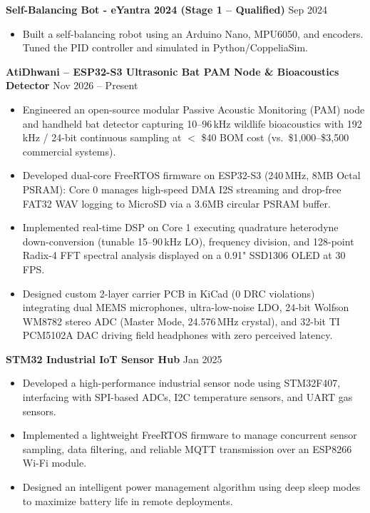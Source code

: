 \documentclass[10pt,a4paper]{article}%
\begin{document}
\noindent \textbf{Self-Balancing Bot - eYantra 2024 (Stage 1 – Qualified)} \hfill Sep 2024%
\begin{itemize}[leftmargin=15pt, nosep, topsep=0pt]%
\item Built a self-balancing robot using an Arduino Nano, MPU6050, and encoders. Tuned the PID controller and simulated in Python/CoppeliaSim.%
\end{itemize} \vspace{8pt}

\noindent \textbf{AtiDhwani -- ESP32-S3 Ultrasonic Bat PAM Node \& Bioacoustics Detector} \hfill Nov 2026 -- Present%
\begin{itemize}[leftmargin=15pt, nosep, topsep=0pt]%
\item Engineered an open-source modular Passive Acoustic Monitoring (PAM) node and handheld bat detector capturing 10--96\,kHz wildlife bioacoustics with 192\,kHz / 24-bit continuous sampling at $<$ \$40 BOM cost (vs.\ \$1,000--\$3,500 commercial systems).%
\item Developed dual-core FreeRTOS firmware on ESP32-S3 (240\,MHz, 8MB Octal PSRAM): Core 0 manages high-speed DMA I2S streaming and drop-free FAT32 WAV logging to MicroSD via a 3.6MB circular PSRAM buffer.%
\item Implemented real-time DSP on Core 1 executing quadrature heterodyne down-conversion (tunable 15--90\,kHz LO), frequency division, and 128-point Radix-4 FFT spectral analysis displayed on a 0.91" SSD1306 OLED at 30\,FPS.%
\item Designed custom 2-layer carrier PCB in KiCad (0 DRC violations) integrating dual MEMS microphones, ultra-low-noise LDO, 24-bit Wolfson WM8782 stereo ADC (Master Mode, 24.576\,MHz crystal), and 32-bit TI PCM5102A DAC driving field headphones with zero perceived latency.%
\end{itemize} \vspace{8pt}

\noindent \textbf{STM32 Industrial IoT Sensor Hub} \hfill Jan 2025%
\begin{itemize}[leftmargin=15pt, nosep, topsep=0pt]%
\item Developed a high-performance industrial sensor node using STM32F407, interfacing with SPI-based ADCs, I2C temperature sensors, and UART gas sensors.%
\item Implemented a lightweight FreeRTOS firmware to manage concurrent sensor sampling, data filtering, and reliable MQTT transmission over an ESP8266 Wi-Fi module.%
\item Designed an intelligent power management algorithm using deep sleep modes to maximize battery life in remote deployments.%
\end{itemize} \vspace{8pt}
\end{document}
